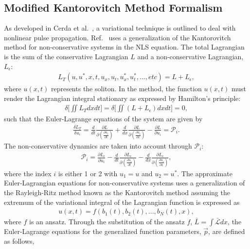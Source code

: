\subsection{Modified Kantorovitch Method Formalism}  \label{sec:KVA}
As developed in Cerda et al.~\cite{Cerda}, a variational technique is outlined to deal with nonlinear pulse propagation.  Ref.~\cite{Cerda} uses a generalization of the Kantorovitch method for non-conservative systems in the NLS equation.  The total Lagrangian is the sum of the conservative Lagrangian $L$ and a non-conservative Lagrangian, $L_{\epsilon}$: 
\begin{align}
L_T(u, u^*, x, t, u_x, u_t, u_x^*, u_t^*, ...,etc) = L + L_{\epsilon}  ,
\end{align}
where $u(x,t)$ represents the soliton.  In the method, the function $u(x,t)$ must render the Lagrangian integral stationary as expressed by Hamilton's principle:
\begin{align}
\delta \Bigg[ \iint L_T dx dt \Bigg] = \delta \Bigg[ \iint (L + L_{\epsilon})dxdt \Bigg] = 0,
\end{align} 
such that the Euler-Lagrange equations of the system are given by
\begin{align}
\frac{\delta L_T}{\delta u_i} = \frac{d}{dt} \frac{\partial L}{\partial (\frac{\partial u_i}{\partial t})} + \frac{d}{dx} \frac{\partial L}{\partial (\frac{\partial u_i}{\partial x})} - \frac{\partial L}{\partial u_i} = \mathcal{P}_i .
\end{align}
The non-conservative dynamics are taken into account through $\mathcal{P}_i$:
\begin{align}
\mathcal{P}_i = \frac{\partial L_{\epsilon}}{\partial u_i } - \frac{d}{dt} \frac{\partial L_{\epsilon}}{\partial (\frac{\partial u_i}{\partial t})} - \frac{d}{dx} \frac{\partial L_{\epsilon}}{\partial (\frac{\partial u_i}{\partial x})},
\end{align}
where the index $i$ is either 1 or 2 with $u_1 = u$ and $u_2 = u^*$.  
The approximate Euler-Lagrangian equations for non-conservative systems uses a generalization of the Rayleigh-Ritz method known as the Kantorovitch method assuming the extremum of the variational integral of the Lagrangian function is expressed as 
\begin{align}
u(x,t) = f(b_1(t), b_2(t), ..., b_N(t), x),
\end{align}
where $f$ is an ansatz.  Through the substitution of the ansatz $f$, $\bar{L}  = \int \bar{\mathcal{L}} dx$, the Euler-Lagrange equations for the generalized function parameters, $\vec{p}$, are defined as follows, 
